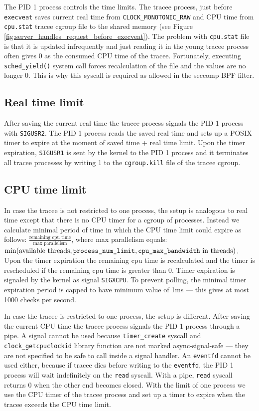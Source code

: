 \documentclass[en]{pracamgr}
\begin{document}
The PID 1 process controls the time limits. The tracee process, just before \texttt{execveat} saves current real time from \texttt{CLOCK\_MONOTONIC\_RAW} and CPU time from \texttt{cpu.stat} tracee cgroup file to the shared memory (see Figure \ref{fig:server_handles_request_before_execveat}). The problem with \texttt{cpu.stat} file is that it is updated infrequently and just reading it in the young tracee process often gives 0 as the consumed CPU time of the tracee. Fortunately, executing \texttt{sched\_yield()} system call forces recalculation of the file and the values are no longer 0. This is why this syscall is required as allowed in the seccomp BPF filter.

\subsection{Real time limit}

After saving the current real time the tracee process signals the PID 1 process with \texttt{SIGUSR2}. The PID 1 process reads the saved real time and sets up a POSIX timer to expire at the moment of saved time + real time limit. Upon the timer expiration, \texttt{SIGUSR1} is sent by the kernel to the PID 1 process and it terminates all tracee processes by writing 1 to the \texttt{cgroup.kill} file of the tracee cgroup.

\subsection{CPU time limit}

In case the tracee is not restricted to one process, the setup is analogous to real time except that there is no CPU timer for a cgroup of processes. Instead we calculate minimal period of time in which the CPU time limit could expire as follows: $\frac{\text{remaining cpu time}}{\text{max parallelism}}$, where max parallelism equals: $\min(\text{available threads}, \text{\texttt{process\_num\_limit}}, \text{\texttt{cpu\_max\_bandwidth} in threads})$. Upon the timer expiration the remaining cpu time is recalculated and the timer is rescheduled if the remaining cpu time is greater than 0. Timer expiration is signaled by the kernel as signal \texttt{SIGXCPU}. To prevent polling, the minimal timer expiration period is capped to have minimum value of 1ms --- this gives at most 1000 checks per second.

In case the tracee is restricted to one process, the setup is different. After saving the current CPU time the tracee process signals the PID 1 process through a pipe. A signal cannot be used because \texttt{timer\_create} syscall and \texttt{clock\_getcpuclockid} library function are not marked async-signal-safe --- they are not specified to be safe to call inside a signal handler. An \texttt{eventfd} cannot be used either, because if tracee dies before writing to the \texttt{eventfd}, the PID 1 process will wait indefinitely on the \texttt{read} syscall. With a pipe, \texttt{read} syscall returns 0 when the other end becomes closed. With the limit of one process we use the CPU timer of the tracee process and set up a timer to expire when the tracee exceeds the CPU time limit.
\end{document}
